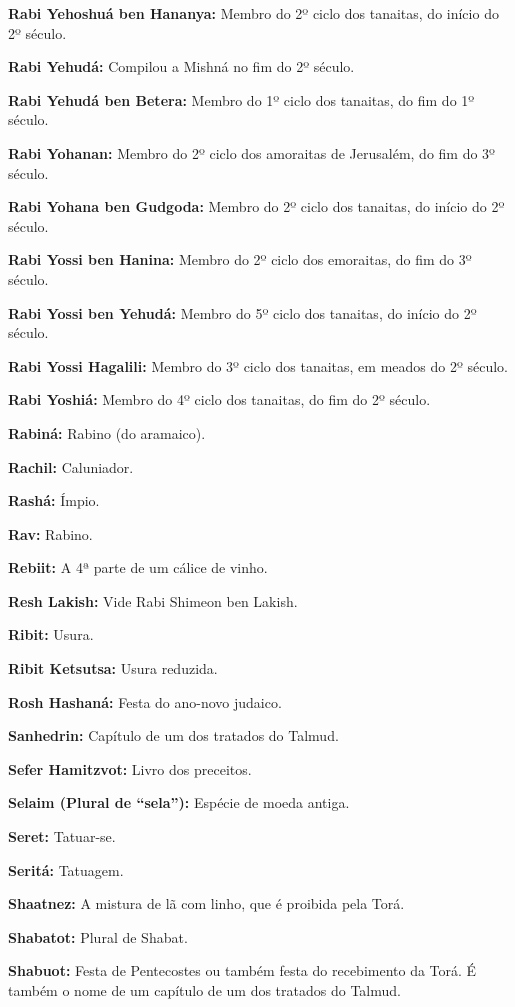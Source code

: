 \begin{hangparas}{.25in}{1}
{\textbf{Rabi Yehoshuá ben Hananya:} Membro do 2º ciclo dos tanaitas, do
início do 2º século.

\textbf{Rabi Yehudá:} Compilou a Mishná no fim do 2º século.

\textbf{Rabi Yehudá ben Betera:} Membro do 1º ciclo dos tanaitas, do
fim do 1º século.

\textbf{Rabi Yohanan:} Membro do 2º ciclo dos amoraitas de Jerusalém,
do fim do 3º século.

\textbf{Rabi Yohana ben Gudgoda:} Membro do 2º ciclo dos tanaitas, do
início do 2º século.

\textbf{Rabi Yossi ben Hanina:} Membro do 2º ciclo dos emoraitas, do fim do 3º século.

\textbf{Rabi Yossi ben Yehudá:} Membro do 5º ciclo dos tanaitas, do início do
2º século.

\textbf{Rabi Yossi Hagalili:} Membro do 3º ciclo dos tanaitas, em meados do 2º século.

\textbf{Rabi Yoshiá:} Membro do 4º ciclo dos tanaitas, do fim do 2º século.

\textbf{Rabiná:} Rabino (do aramaico).

\textbf{Rachil:} Caluniador.

\textbf{Rashá:} Ímpio.

\textbf{Rav:} Rabino.

\textbf{Rebiit:} A 4ª parte de um cálice de vinho.

\textbf{Resh Lakish:} Vide Rabi Shimeon ben Lakish.

\textbf{Ribit:} Usura.

\textbf{Ribit Ketsutsa:} Usura reduzida.

\textbf{Rosh Hashaná:} Festa do ano-novo judaico.

\textbf{Sanhedrin:} Capítulo de um dos tratados do Talmud.

\textbf{Sefer Hamitzvot:} Livro dos preceitos.

\textbf{Selaim (Plural de ``sela''):} Espécie de moeda antiga.

\textbf{Seret:} Tatuar-se.

\textbf{Seritá:} Tatuagem.

\textbf{Shaatnez:} A mistura de lã com linho, que é proibida pela
Torá.

\textbf{Shabatot:} Plural de Shabat.

\textbf{Shabuot:} Festa de Pentecostes ou também festa do recebimento
da Torá. É também o nome de um capítulo de um dos tratados do Talmud.

}
\end{hangparas}
